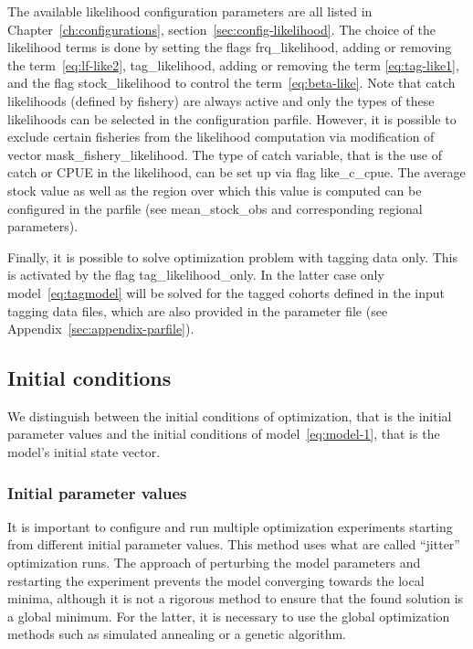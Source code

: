The available likelihood configuration parameters are all listed in Chapter~\ref{ch:configurations}, section~\ref{sec:config-likelihood}. The choice of the likelihood terms is done by setting the flags {\ttfamily frq\_likelihood}, adding or removing the term~\ref{eq:lf-like2},  {\ttfamily tag\_likelihood}, adding or removing the term \ref{eq:tag-like1}, and the flag {\ttfamily stock\_likelihood} to control the term~\ref{eq:beta-like}. Note that catch likelihoods (defined by fishery) are always active and only the types of these likelihoods can be selected in the configuration parfile. However, it is possible to exclude certain fisheries from the likelihood computation via modification of vector {\ttfamily mask\_fishery\_likelihood}. The type of catch variable, that is the use of catch or CPUE in the likelihood, can be set up via flag {\ttfamily like\_c\_cpue}. The average stock value as well as the region over which this value is computed can be configured in the parfile (see {\ttfamily mean\_stock\_obs} and corresponding regional parameters).

Finally, it is possible to solve optimization problem with tagging data only. This is activated by the flag {\ttfamily tag\_likelihood\_only}. In the latter case only model~\ref{eq:tagmodel} will be solved for the tagged cohorts defined in the input tagging data files, which are also provided in the parameter file (see Appendix~\ref{sec:appendix-parfile}).
 
\subsection{Initial conditions}

We distinguish between the initial conditions of optimization, that is the initial parameter values and the initial conditions of model~\ref{eq:model-1}, that is the model's initial state vector. 

\subsubsection{Initial parameter values}

It is important to configure and run multiple optimization experiments starting from different initial parameter values. This method uses what are called ``jitter'' optimization runs. The approach of perturbing the model parameters and restarting the experiment prevents the model converging towards the local minima, although it is not a rigorous method to ensure that the found solution is a global minimum. For the latter, it is necessary to use the global optimization methods such as simulated annealing \citep{Matear} or a genetic algorithm. 

